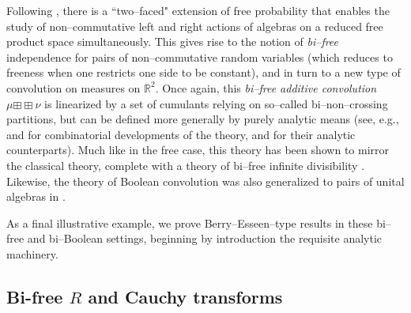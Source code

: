 \documentclass{amsart}
\theoremstyle{definition}
\theoremstyle{remark}
\numberwithin{equation}{section}
\begin{document}
 Following \cite{Voiculescu1, Voiculescu2}, there is a ``two--faced" extension of free probability that enables the study of non--commutative left and right actions of algebras on a reduced free product space simultaneously. This gives rise to the notion of \textit{bi--free} independence for pairs of non--commutative random variables (which reduces to freeness when one restricts one side to be constant), and in turn to a new type of convolution on measures on $\mathbb{R}^2$. Once again, this \textit{bi--free additive convolution $\mu {\boxplus\boxplus} \nu$} is linearized by a set of cumulants relying on so--called bi--non--crossing partitions, but can be defined more generally by purely analytic means (see, e.g., \cite{Voiculescu1} and \cite{CharlesworthNelsonSkoufranis2} for combinatorial developments of the theory, and \cite{HuangWang} for their analytic counterparts). Much like in the free case, this theory has been shown to mirror the classical theory, complete with a theory of bi--free infinite divisibility \cite{HasebeHuangWang, GuHuangMingo}. Likewise, the theory of Boolean convolution was also generalized to pairs of unital algebras in \cite{GuSkoufranis}.

As a final illustrative example, we prove Berry--Esseen--type results in these bi--free and bi--Boolean settings, beginning by introduction the requisite analytic machinery.

\subsection{Bi-free $R$ and Cauchy transforms}
\end{document}
